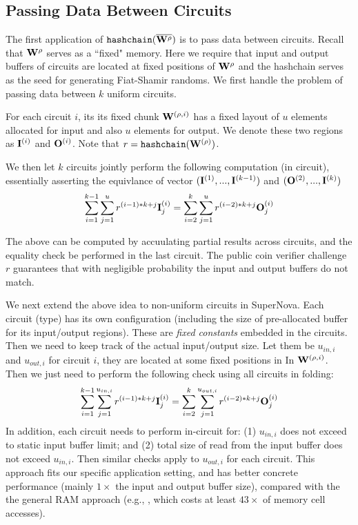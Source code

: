 \subsection{Passing Data Between Circuits}
The first application of 
$\texttt{hashchain}(\overline{{{\mathbf {W}}}^{\rho}})$ is to pass data
between circuits. Recall that ${{\mathbf {W}}}^{\rho}$ serves
as a ``fixed" memory.  Here we require that input and output
buffers of circuits are located at fixed positions of
${{\mathbf {W}}}^{\rho}$ and the hashchain serves as the seed
for generating Fiat-Shamir randoms. We first handle
the problem of passing data between $k$ uniform circuits.

For each circuit $i$, its its fixed chunk 
${{\mathbf {W}}}^{(\rho,i)}$ has a fixed
layout of $u$ elements allocated for input and also $u$ elements
for output. We denote these two regions as
${{\mathbf {I}}}^{(i)}$ and ${{\mathbf {O}}}^{(i)}$.  
Note that $r = \texttt{hashchain}({{\mathbf {W}}}^{(\rho)})$.

We then let $k$ circuits jointly perform the following computation
(in circuit), essentially asserting the equivlance of
vector 
$({{\mathbf {I}}}^{(1)}, ..., {{\mathbf {I}}}^{(k-1)})$ and
$({{\mathbf {O}}}^{(2)}, ..., {{\mathbf {I}}}^{(k)})$
\[
  \sum_{i=1}^{k-1} \sum_{j=1}^u r^{(i-1)*k+j} {{\mathbf {I}}}^{(i)}_j = 
  \sum_{i=2}^k \sum_{j=1}^u r^{(i-2)*k+j} {{\mathbf {O}}}^{(i)}_j 
\]

The above can be computed by accuulating partial results 
across circuits, and the equality check be performed in the
last circuit. The public coin verifier challenge $r$
guarantees that with negligible probability
the input and output buffers do not match.

We next extend the above idea to non-uniform circuits in SuperNova. 
Each circuit (type) has its own configuration (including the
size of pre-allocated buffer for its input/output regions). These
are {\em fixed constants} embedded in the circuits.
Then we need to keep track of the actual
input/output size. Let them be
$u_{in,i}$ and $u_{out,i}$ for circuit $i$, they are
located at some fixed positions in In ${{\mathbf {W}}}^{(\rho,i)}$.
Then we just need to perform the following check using
all circuits in folding:
\[
  \sum_{i=1}^{k-1} \sum_{j=1}^{u_{in,i}} r^{(i-1)*k+j} {{\mathbf {I}}}^{(i)}_j = 
  \sum_{i=2}^k \sum_{j=1}^{u_{out,i}} r^{(i-2)*k+j} {{\mathbf {O}}}^{(i)}_j 
\]
In addition, each circuit needs to perform in-circuit for: (1) 
$u_{in,i}$ does not exceed to static input buffer limit; and (2)
total size of read from the input buffer does not exceed $u_{in,i}$.
Then similar checks apply to $u_{out,i}$ for each circuit.
This approach fits our specific application setting, and
has better concrete performance (mainly $1\times$ the input
and output buffer size), compared with the
the general RAM approach (e.g., \cite{AIPRam}, which
costs at least $43\times$ of memory cell accesses). 

